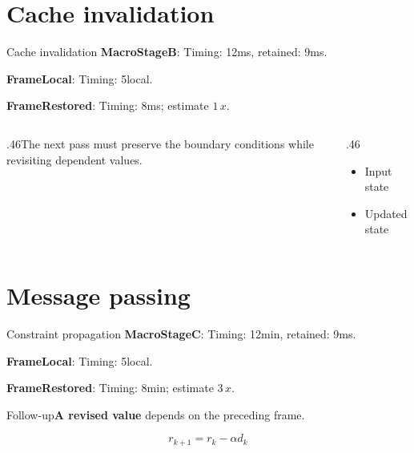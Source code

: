 \documentclass[12pt,aspectratio=43]{beamer}
\newcommand{\fuzzlayerA}[1]{\textbf{#1}}
\newcommand{\fuzzterm}[1]{\fuzzlayerA{#1}}
\newcommand{\fuzzpair}[2]{\fuzzterm{#1}: #2}
\newcommand{\fuzzunit}{ms}
\let\fuzzoriginalunit\fuzzunit
\newcommand{\fuzzcoefficient}{1}
\newcommand{\fuzzscale}[2][\fuzzcoefficient]{#1\,#2}
\begin{document}
\section{Cache invalidation}
\begin{frame}[t]{Cache invalidation}
\fuzzpair{MacroStageB}{Timing: 12\fuzzunit, retained: 9\fuzzoriginalunit.}\par
{\renewcommand{\fuzzunit}{local}\fuzzpair{FrameLocal}{Timing: 5\fuzzunit.}\par}
\fuzzpair{FrameRestored}{Timing: 8\fuzzunit; estimate $\fuzzscale{x}$.}\par
\begin{columns}[T]\begin{column}{.46\textwidth}The next pass must preserve the boundary conditions while revisiting dependent values.\end{column}\begin{column}{.46\textwidth}\begin{itemize}\item Input state\item Updated state\end{itemize}\end{column}\end{columns}
\end{frame}
\renewcommand{\fuzzunit}{min}
\renewcommand{\fuzzcoefficient}{3}
\renewcommand{\fuzzterm}[1]{{\textbf{#1}}}
\section{Message passing}
\begin{frame}[t]{Constraint propagation}
\fuzzpair{MacroStageC}{Timing: 12\fuzzunit, retained: 9\fuzzoriginalunit.}\par
{\renewcommand{\fuzzunit}{local}\fuzzpair{FrameLocal}{Timing: 5\fuzzunit.}\par}
\fuzzpair{FrameRestored}{Timing: 8\fuzzunit; estimate $\fuzzscale{x}$.}\par
\begin{block}{Follow-up}\fuzzterm{A revised value} depends on the preceding frame.\end{block}
\[r_{k+1}=r_k-\alpha d_k\]
\end{frame}
\renewcommand{\fuzzunit}{us}
\renewcommand{\fuzzcoefficient}{4}
\renewcommand{\fuzzterm}[1]{{\textbf{#1}}}
\end{document}
